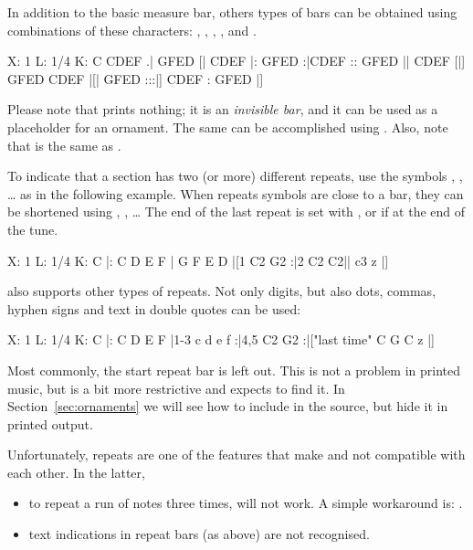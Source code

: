 \documentclass[a4paper,12pt]{book}
\begin{document}
In addition to the basic measure bar, others types of bars can be
obtained using combinations of these characters: \car{\textbar{}},
, \car{[}, \car{]}, and \car{:}.

\begin{abcsource}
X: 1
L: 1/4
K: C
CDEF .| GFED [| CDEF |: GFED :|CDEF :: GFED || CDEF [|] GFED
CDEF |[| GFED :::|] CDEF : GFED |]
\end{abcsource}


Please note that \cmd{[|]} prints nothing; it is an \emph{invisible
bar}, and it can be used as a placeholder for an ornament. The same
can be accomplished using \cmd{[]}. Also, note that \cmd{:} is the
same as .

To indicate that a section has two (or more) different repeats, use
the symbols \cmd{[1}, \cmd{[2}, {\ldots} as in the following example.
When repeats symbols are close to a bar, they can be shortened using
, , {\ldots} The end of the last repeat
is set with \cmd{\textbar\textbar}, or \cmd{\textbar]} if at the end
of the tune.

\begin{abcsource}
X: 1
L: 1/4
K: C
|: C D E F | G F E D |[1 C2 G2 :|2 C2 C2|| c3 z |]
\end{abcsource}


\abcm{} also supports other types of repeats. Not only digits, but
also dots, commas, hyphen signs and text in double quotes can be used:

\begin{abcsource}
X: 1
L: 1/4
K: C
|: C D E F |1-3 c d e f :|4,5 C2 G2 :|["last time" C G C z |]
\end{abcsource}


Most commonly, the start repeat bar \cmd{|:} is left out. This is not
a problem in printed music, but \abcMID{} is a bit more restrictive
and expects to find it. In Section~\ref{sec:ornaments} we will see how
to include \cmd{|:} in the source, but hide it in printed output.

\begin{warn}

  Unfortunately, repeats are one of the features that make \abcm{} and
  \abcMID{} not compatible with each other. In the latter,
  
  \begin{itemize}
    
    \item to repeat a run of notes three times, \cmd{|:: ::|} will not
    work. A simple workaround is: .
    
    \item text indications in repeat bars (as  above)
    are not recognised.    
    
  \end{itemize}

\end{warn}
\end{document}
